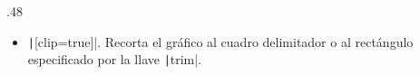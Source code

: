 \begin{frame}[fragile]
\begin{columns}
\begin{column}{.48\paperwidth}
\begin{itemize}
				\item

				      \texttt|[clip=true]|.
				      Recorta el gráfico al cuadro delimitador o al
				      rectángulo especificado por la llave
				      \texttt|trim|.
			\end{itemize}
		\end{column}
	\end{columns}

	\begin{example}\end{example} %
\end{frame}

